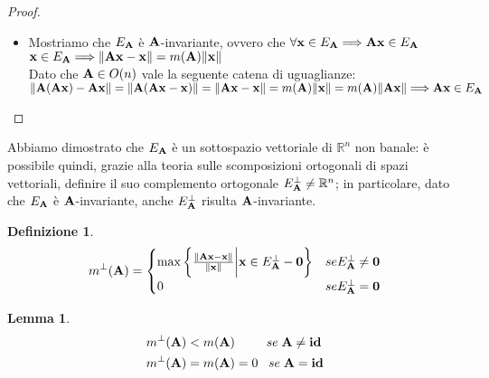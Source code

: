 \documentclass[a4paper,11pt,openright,twoside	]{book}
\newtheorem{definition}{Definizione}[section]
\newtheorem{lemma}[theorem]{Lemma}
\begin{document}
\begin{proof}
\begin{itemize}
In particolare $\vb{x} \neq \vb{0}$  (perché ha norma 1) e 
\[ \norm{\vb{Ax - x}} = m(\vb{A}) = m(\vb{A})\norm{\vb{x}} \Longrightarrow \vb{x} \in E_{\vb{A}}\]
\item Mostriamo che $E_{\vb{A}}$ è $\vb{A}$-invariante, ovvero che  $\forall \vb{x} \in E_{\vb{A}} \Longrightarrow \vb{Ax} \in E_{\vb{A}}$ \\
$\vb{x} \in E_{\vb{A}} \Longrightarrow \norm{\vb{Ax-x}} = m(\vb{A})\norm{\vb{x}} $ \\
Dato che $\vb{A} \in O(n)$ vale la seguente catena di uguaglianze:\\
$ \norm{\vb{A(Ax) - Ax }} =  \norm{\vb{A(Ax-x)}} = \norm{\vb{Ax - x}} = m(\vb{A})\norm{\vb{x}} = m(\vb{A})\norm{\vb{Ax}} \Longrightarrow \vb{Ax} \in E_{\vb{A}}$
\end{itemize} 
\end{proof}
Abbiamo dimostrato che $E_{\vb{A}}$ è un sottospazio vettoriale di $\mathbb{R}^n $ non banale: è possibile quindi, grazie alla teoria sulle scomposizioni ortogonali di spazi vettoriali, definire il suo complemento ortogonale $E^{\perp}_{\vb{A}} \neq \mathbb{R}^n$;  in particolare, dato che $E_{\vb{A}}$ è $\vb{A}$-invariante, anche $E^{\perp}_{\vb{A}}$ risulta $\vb{A}$-invariante. 
\begin{definition}
\[ m^{\perp}(\vb{A}) = \begin{cases} 
      \max \bigg\{ \frac{\norm{\vb{Ax-x}}}{\norm{\vb{x}}} \bigg|  \vb{x} \in E^{\perp}_{\vb{A}} - \vb{0} \bigg\}  &  se   E^{\perp}_{\vb{A}} \neq {\vb{0}} \\
      0 & se   E^{\perp}_{\vb{A}} = {\vb{0}} \\
      
   \end{cases}
\]
\end{definition}
\begin{lemma}
\begin{equation}
\label{diseq:ma}
\begin{split}
m^{\perp}(\vb{A})  & < m(\vb{A}) \; \; \; \; \; \; \; \; \; se \; \vb{A \neq id}  \\
 m^{\perp}(\vb{A})  & = m(\vb{A}) = 0 \; \; \;  se \; \vb{A = id}
\end{split}
\end{equation}
\end{lemma}
\end{document}
